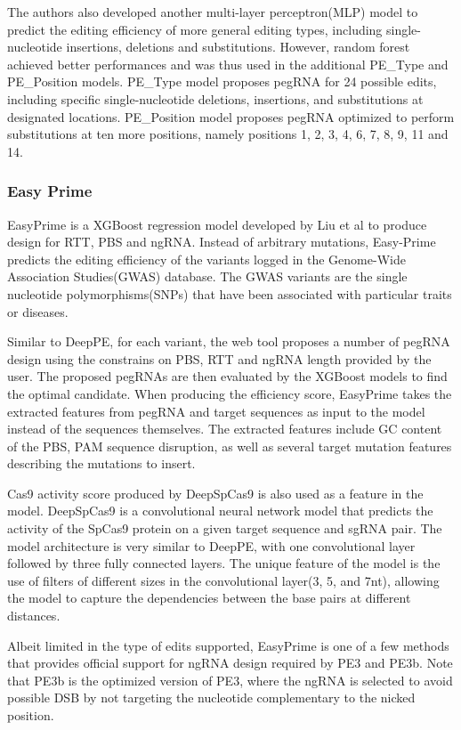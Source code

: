 The authors also developed another multi-layer perceptron(MLP) model to predict the editing efficiency of more general editing types, including single-nucleotide insertions, deletions and substitutions. However, random forest achieved better performances and was thus used in the additional PE\_Type and PE\_Position models. PE\_Type model proposes pegRNA for 24 possible edits, including specific single-nucleotide deletions, insertions, and substitutions at designated locations. PE\_Position model proposes pegRNA optimized to perform substitutions at ten more positions, namely positions 1, 2, 3, 4, 6, 7, 8, 9, 11 and 14.

\subsubsection{Easy Prime}

EasyPrime is a XGBoost regression model developed by Liu et al to produce design for RTT, PBS and ngRNA. Instead of arbitrary mutations, Easy-Prime predicts the editing efficiency of the variants logged in the Genome-Wide Association Studies(GWAS) database. The GWAS variants are the single nucleotide polymorphisms(SNPs) that have been associated with particular traits or diseases.

Similar to DeepPE, for each variant, the web tool proposes a number of pegRNA design using the constrains on PBS, RTT and ngRNA length provided by the user. The proposed pegRNAs are then evaluated by the XGBoost models to find the optimal candidate. When producing the efficiency score, EasyPrime takes the extracted features from pegRNA and target sequences as input to the model instead of the sequences themselves. The extracted features include GC content of the PBS, PAM sequence disruption, as well as several target mutation features describing the mutations to insert.

Cas9 activity score produced by DeepSpCas9 is also used as a feature in the model. DeepSpCas9 is a convolutional neural network model that predicts the activity of the SpCas9 protein on a given target sequence and sgRNA pair. The model architecture is very similar to DeepPE, with one convolutional layer followed by three fully connected layers. The unique feature of the model is the use of filters of different sizes in the convolutional layer(3, 5, and 7nt), allowing the model to capture the dependencies between the base pairs at different distances\cite{kimSpCas9ActivityPrediction2019}.

Albeit limited in the type of edits supported, EasyPrime is one of a few methods that provides official support for ngRNA design required by PE3 and PE3b. Note that PE3b is the optimized version of PE3, where the ngRNA is selected to avoid possible DSB by not targeting the nucleotide complementary to the nicked position\cite{liudavidr.SearchandreplaceGenomeEditing2019}.

